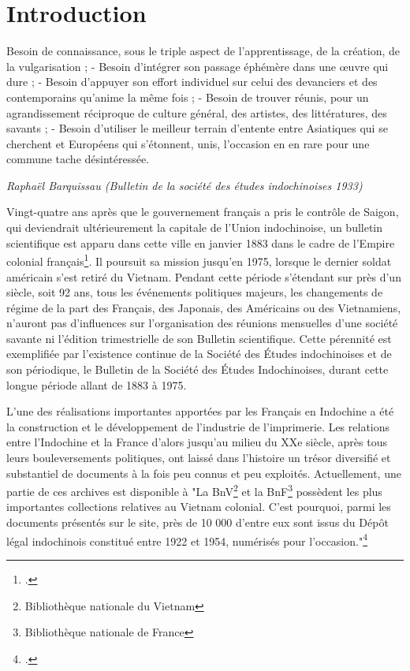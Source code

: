 \part*{Introduction}

\vspace*{\fill}
\epigraph{Besoin de connaissance, sous le triple aspect de l’apprentissage, de la création, de la vulgarisation ; 
-	Besoin d’intégrer son passage éphémère dans une œuvre qui dure ; 
-	Besoin d’appuyer son effort individuel sur celui des devanciers et des contemporains qu’anime la même fois ;
-	Besoin de trouver réunis, pour un agrandissement réciproque de culture général, des artistes, des littératures, des savants ; 
-	Besoin d’utiliser le meilleur terrain d’entente entre Asiatiques qui se cherchent et Européens qui s’étonnent, unis, l'occasion en en rare pour une commune tache désintéressée.}{\textit{Raphaël Barquissau (Bulletin de la société des études indochinoises 1933)}}


\vfill\clearpage
Vingt-quatre ans après que le gouvernement français a pris le contrôle de Saigon, qui deviendrait ultérieurement la capitale de l'Union indochinoise, un bulletin scientifique est apparu dans cette ville en janvier 1883 dans le cadre de l'Empire colonial français\footcites{paris_2016}. Il poursuit sa mission jusqu'en 1975, lorsque le dernier soldat américain s'est retiré du Vietnam. Pendant cette période s'étendant sur près d'un siècle, soit 92 ans, tous les événements politiques majeurs, les changements de régime de la part des Français, des Japonais, des Américains ou des Vietnamiens, n'auront pas d'influences sur l'organisation des réunions mensuelles d'une société savante ni l'édition trimestrielle de son Bulletin scientifique. Cette pérennité est exemplifiée par l'existence continue de la Société des Études indochinoises et de son périodique, le Bulletin de la Société des Études Indochinoises, durant cette longue période allant de 1883 à 1975.

L'une des réalisations importantes apportées par les Français en Indochine a été la construction et le développement de l'industrie de l'imprimerie. Les relations entre l'Indochine et la France d'alors jusqu'au milieu du XXe siècle, après tous leurs bouleversements politiques, ont laissé dans l'histoire un trésor diversifié et substantiel de documents à la fois peu connus et peu exploités. Actuellement, une partie de ces archives est disponible à "La BnV\footnote{Bibliothèque nationale du Vietnam} et la BnF\footnote{Bibliothèque nationale de France} possèdent les plus importantes collections relatives au Vietnam colonial. C'est pourquoi, parmi les documents présentés sur le site, près de 10 000 d'entre eux sont issus du Dépôt légal indochinois constitué entre 1922 et 1954, numérisés pour l'occasion."\footcites{good34}
 
